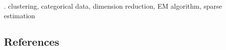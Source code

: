 \documentclass[12pt]{article}
\begin{document}
\vskip 2mm

.  clustering, categorical data, dimension
reduction, EM algorithm, sparse estimation


%        
%
%        

\subsection*{References}
\end{document}

